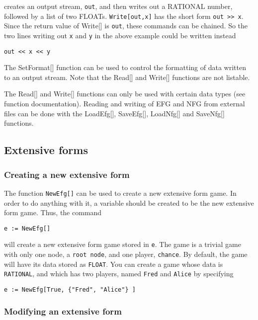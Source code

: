 creates an output stream, \verb+out+, and then writes out a RATIONAL
number, followed by a list of two FLOATs.  \verb+Write[out,x]+ has the
short form \verb+out >> x+.  Since the return value of Write[] is
\verb+out+, these commands can be chained.  So the two lines writing out
\verb+x+ and \verb+y+ in the above example could be written instead

\begin{verbatim}
out << x << y
\end{verbatim}
 
The SetFormat[] function can be used to control the formatting of data
written to an output stream.  Note that the Read[] and Write[]
functions are not listable.

The Read[] and Write[] functions can only be used with certain data
types (see function documentation).  Reading and writing of EFG and
NFG from external files can be done with the LoadEfg[], SaveEfg[],
LoadNfg[] and SaveNfg[] functions.  

\subsection{Extensive forms}

\subsubsection{Creating a new extensive form}

The function {\tt NewEfg[]} can be used to create a new extensive form game.
In order to do anything with it, a variable should be created to be
the new extensive form game.  Thus, the command

\begin{verbatim}
e := NewEfg[]
\end{verbatim}

\noindent will create a new extensive form game stored in \verb+e+.  The game 
is a trivial game with only one node, a \verb+root node+, and one
player, \verb+chance+.  By default, the game will have its data stored
as \verb+FLOAT+.  You can create a game whose data is \verb+RATIONAL+,
and which has two players, named \verb+Fred+ and \verb+Alice+  by
specifying 


\begin{verbatim}
e := NewEfg[True, {"Fred", "Alice"} ]
\end{verbatim}

\subsubsection{Modifying an extensive form}

